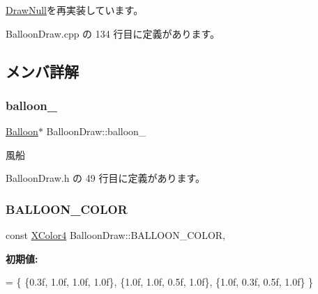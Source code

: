 \mbox{\hyperlink{class_draw_null_ad32a508d269de7eda8ad24ea72230464}{Draw\+Null}}を再実装しています。



 Balloon\+Draw.\+cpp の 134 行目に定義があります。



\subsection{メンバ詳解}
\mbox{\label{class_balloon_draw_a1d503c50dd419f2dd364c6e18f975585}} 
\subsubsection{\texorpdfstring{balloon\+\_\+}{balloon\_}}
{\footnotesize\ttfamily \mbox{\hyperlink{class_balloon}{Balloon}}$\ast$ Balloon\+Draw\+::balloon\+\_\+\hspace{0.3cm}{\ttfamily [private]}}



風船 



 Balloon\+Draw.\+h の 49 行目に定義があります。

\mbox{\label{class_balloon_draw_a13857f5f6308f7f2903322c7a86b18fd}} 
\subsubsection{\texorpdfstring{B\+A\+L\+L\+O\+O\+N\+\_\+\+C\+O\+L\+OR}{BALLOON\_COLOR}}
{\footnotesize\ttfamily const \mbox{\hyperlink{_vector3_d_8h_a680c30c4a07d86fe763c7e01169cd6cc}{X\+Color4}} Balloon\+Draw\+::\+B\+A\+L\+L\+O\+O\+N\+\_\+\+C\+O\+L\+OR\hspace{0.3cm}{\ttfamily [static]}, {\ttfamily [private]}}

{\bfseries 初期値\+:}
\begin{DoxyCode}
=
\{
    \{0.3f, 1.0f, 1.0f, 1.0f\},
    \{1.0f, 1.0f, 0.5f, 1.0f\},
    \{1.0f, 0.3f, 0.5f, 1.0f\}
\}
\end{DoxyCode}


